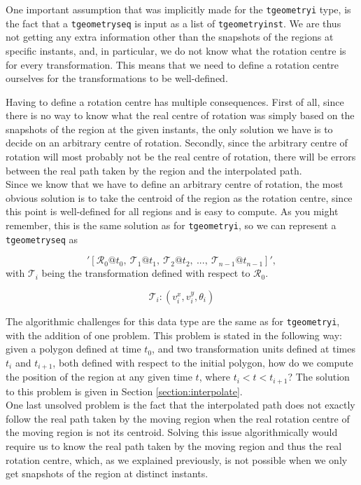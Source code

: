 One important assumption that was implicitly made for the \lstinline{tgeometryi} type, is the fact that a \lstinline{tgeometryseq} is input as a list of \lstinline+tgeometryinst+. We are thus not getting any extra information other than the snapshots of the regions at specific instants, and, in particular, we do not know what the rotation centre is for every transformation. This means that we need to define a rotation centre ourselves for the transformations to be well-defined.

Having to define a rotation centre has multiple consequences. First of all, since there is no way to know what the real centre of rotation was simply based on the snapshots of the region at the given instants, the only solution we have is to decide on an arbitrary centre of rotation. Secondly, since the arbitrary centre of rotation will most probably not be the real centre of rotation, there will be errors between the real path taken by the region and the interpolated path. \\

Since we know that we have to define an arbitrary centre of rotation, the most obvious solution is to take the centroid of the region as the rotation centre, since this point is well-defined for all regions and is easy to compute. As you might remember, this is the same solution as for \lstinline{tgeometryi}, so we can represent a \lstinline{tgeometryseq} as 

\[
    '[\mathcal{R}_0@t_0,\ \mathcal{T}_1@t_1,\ \mathcal{T}_2@t_2,\ ..., \ \mathcal{T}_{n-1}@t_{n-1}]', 
\]
with $\mathcal{T}_i$ being the transformation defined with respect to $\mathcal{R}_0$.

\[
    \mathcal{T}_i: (v_i^x, v_i^y, \theta_i)
\]

The algorithmic challenges for this data type are the same as for \lstinline{tgeometryi}, with the addition of one problem. This problem is stated in the following way: given a polygon defined at time $t_0$, and two transformation units defined at times $t_i$ and $t_{i+1}$, both defined with respect to the initial polygon, how do we compute the position of the region at any given time $t$, where $t_i < t < t_{i+1}$? The solution to this problem is given in Section \ref{section:interpolate}. \\

One last unsolved problem is the fact that the interpolated path does not exactly follow the real path taken by the moving region when the real rotation centre of the moving region is not its centroid. Solving this issue algorithmically would require us to know the real path taken by the moving region and thus the real rotation centre, which, as we explained previously, is not possible when we only get snapshots of the region at distinct instants. 

